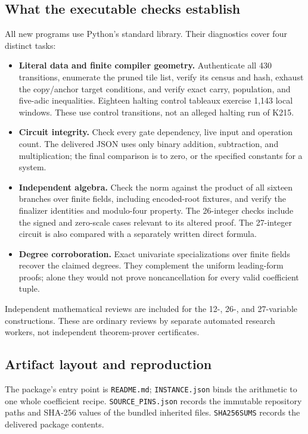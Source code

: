 \subsection{What the executable checks establish}

All new programs use Python's standard library.  Their diagnostics
cover four distinct tasks:
\begin{itemize}
\item \textbf{Literal data and finite compiler geometry.}  Authenticate
      all 430 transitions, enumerate the pruned tile list, verify its
      census and hash, exhaust the copy/anchor target conditions, and
      verify exact carry, population, and five-adic inequalities.
      Eighteen halting control tableaux exercise 1,143 local windows.
      These use control transitions, not an alleged halting run of K215.
\item \textbf{Circuit integrity.}  Check every gate dependency, live
      input and operation count.  The delivered JSON uses only binary
      addition, subtraction, and multiplication; the final comparison
      is to zero, or the specified constants for a system.
\item \textbf{Independent algebra.}  Check the norm against the product
      of all sixteen branches over finite fields, including encoded-root
      fixtures, and verify the finalizer identities and modulo-four
      property.  The 26-integer checks include the signed and zero-scale
      cases relevant to its altered proof.  The 27-integer circuit is
      also compared with a separately written direct formula.
\item \textbf{Degree corroboration.}  Exact univariate specializations
      over finite fields recover the claimed degrees.  They complement
      the uniform leading-form proofs; alone they would not prove
      noncancellation for every valid coefficient tuple.
\end{itemize}
Independent mathematical reviews are included for the 12-, 26-, and
27-variable constructions.  These are ordinary reviews by separate
automated research workers, not independent theorem-prover certificates.

\subsection{Artifact layout and reproduction}

The package's entry point is \texttt{README.md};
\texttt{INSTANCE.json} binds the arithmetic to one whole coefficient
recipe.  \texttt{SOURCE\_PINS.json} records the immutable repository
paths and SHA-256 values of the bundled inherited files.
\texttt{SHA256SUMS} records the delivered package contents.

